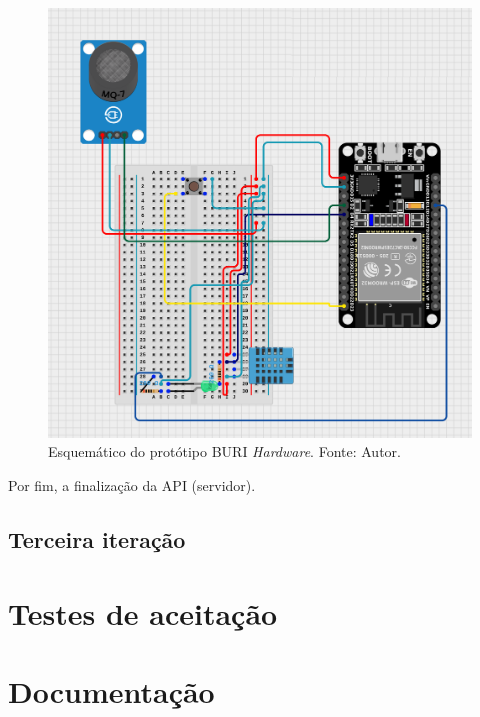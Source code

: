 \begin{figure}[ht]
    \centering
    \includegraphics[width=.68\textwidth]{img/buri_esquematico.png}
    \caption{Esquemático do protótipo BURI \textit{Hardware}. Fonte: Autor.}\label{figSchematicBuriHardware}
\end{figure}

Por fim, a finalização da API (servidor).  

\subsection{Terceira iteração}\label{ExecAtv3It}

\section{Testes de aceitação}\label{fase5}

\section{Documentação}\label{fase6}